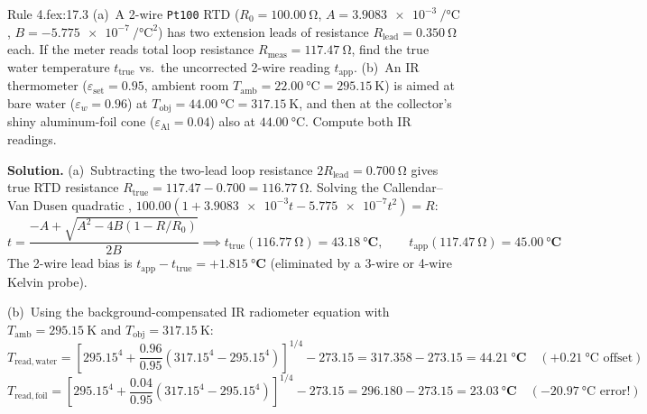 \begin{workedexample}{Rule 4.f}{ex:17.3}
(a)~A 2-wire \texttt{Pt100} RTD ($R_0 = \SI{100.00}{\ohm}$, $A = \SI{3.9083e-3}{\per\celsius}$, $B = \SI{-5.775e-7}{\per\square\celsius}$) has two extension leads of resistance $R_{\mathrm{lead}} = \SI{0.350}{\ohm}$ each. If the meter reads total loop resistance $R_{\mathrm{meas}} = \SI{117.47}{\ohm}$, find the true water temperature $t_{\mathrm{true}}$ vs.\ the uncorrected 2-wire reading $t_{\mathrm{app}}$.
(b)~An IR thermometer ($\varepsilon_{\mathrm{set}} = 0.95$, ambient room $T_{\mathrm{amb}} = \SI{22.00}{\celsius} = \SI{295.15}{\kelvin}$) is aimed at bare water ($\varepsilon_w = 0.96$) at $T_{\mathrm{obj}} = \SI{44.00}{\celsius} = \SI{317.15}{\kelvin}$, and then at the collector's shiny aluminum-foil cone ($\varepsilon_{\mathrm{Al}} = 0.04$) also at $\SI{44.00}{\celsius}$. Compute both IR readings.
\par\smallskip\noindent
\textbf{Solution.}
(a)~Subtracting the two-lead loop resistance $2R_{\mathrm{lead}} = \SI{0.700}{\ohm}$ gives true RTD resistance $R_{\mathrm{true}} = 117.47 - 0.700 = \SI{116.77}{\ohm}$. Solving the Callendar--Van Dusen quadratic , $100.00(1 + \num{3.9083e-3}t - \num{5.775e-7}t^2) = R$:
$$t = \frac{-A + \sqrt{A^2 - 4B(1 - R/R_0)}}{2B} \implies t_{\mathrm{true}}(\SI{116.77}{\ohm}) = \mathbf{\SI{43.18}{\celsius}}, \qquad t_{\mathrm{app}}(\SI{117.47}{\ohm}) = \mathbf{\SI{45.00}{\celsius}}$$
The 2-wire lead bias is $t_{\mathrm{app}} - t_{\mathrm{true}} = \mathbf{+\SI{1.815}{\celsius}}$ (eliminated by a 3-wire or 4-wire Kelvin probe).
\par\noindent
(b)~Using the background-compensated IR radiometer equation  with $T_{\mathrm{amb}} = \SI{295.15}{\kelvin}$ and $T_{\mathrm{obj}} = \SI{317.15}{\kelvin}$:
$$T_{\mathrm{read,water}} = \left[295.15^4 + \frac{0.96}{0.95}\left(317.15^4 - 295.15^4\right)\right]^{1/4} - 273.15 = 317.358 - 273.15 = \mathbf{\SI{44.21}{\celsius}} \quad (+\SI{0.21}{\celsius}\text{ offset})$$
$$T_{\mathrm{read,foil}} = \left[295.15^4 + \frac{0.04}{0.95}\left(317.15^4 - 295.15^4\right)\right]^{1/4} - 273.15 = 296.180 - 273.15 = \mathbf{\SI{23.03}{\celsius}} \quad (-\SI{20.97}{\celsius}\text{ error!})$$
\end{workedexample}

